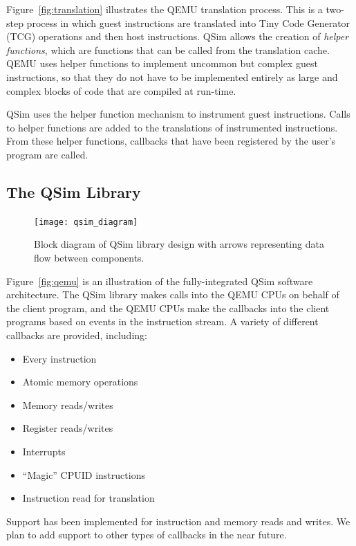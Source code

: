 \documentclass[letterpaper, 10pt]{book}
\begin{document}
Figure~\ref{fig:translation} illustrates the QEMU translation process. This is a
two-step process in which guest instructions are translated into Tiny Code
Generator (TCG) operations and then host instructions. QSim allows the creation
of \emph{helper functions}, which are functions that can be called from the
translation cache. QEMU uses helper functions to implement uncommon but complex
guest instructions, so that they do not have to be implemented entirely as large
and complex blocks of code that are compiled at run-time.

QSim uses the helper function mechanism to instrument guest instructions. Calls
to helper functions are added to the translations of instrumented instructions.
From these helper functions, callbacks that have been registered by the user's
program are called.

\subsection{The QSim Library}

\begin{figure}
\begin{center}
\texttt{[image: qsim\_diagram]}
\caption{Block diagram of QSim library design with arrows representing data flow
         between components.}
\label{fig:qsim}
\end{center}
\end{figure}

Figure~\ref{fig:qemu} is an illustration of the fully-integrated
QSim software architecture. The QSim library makes calls into the QEMU CPUs on
behalf of the client program, and the QEMU CPUs make the callbacks into the
client programs based on events in the instruction stream. A variety of
different callbacks are provided, including:

\begin{itemize}
  \item{Every instruction}
  \item{Atomic memory operations}
  \item{Memory reads/writes}
  \item{Register reads/writes}
  \item{Interrupts}
  \item{``Magic'' CPUID instructions}
  \item{Instruction read for translation}
\end{itemize}

Support has been implemented for instruction and memory reads and writes. We
plan to add support to other types of callbacks in the near future.
\end{document}
